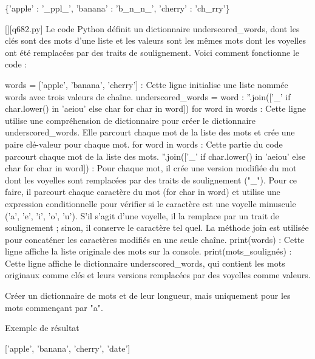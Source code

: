 \{'apple' : '\_ppl\_', 'banana' : 'b\_n\_n\_', 'cherry' : 'ch\_rry'\}
        \par
        \begin{solution}
            \renewcommand{\nomfichier}{q682.py}
            \pythonfile{\chemincode \nomfichier}[][\nomfichier]
            Le code Python définit un dictionnaire underscored_words, dont les clés sont des mots d'une liste et les valeurs sont les mêmes mots dont les voyelles ont été remplacées par des traits de soulignement. Voici comment fonctionne le code :

    words = ['apple', 'banana', 'cherry'] : Cette ligne initialise une liste nommée words avec trois valeurs de chaîne.
    underscored_words = {word : ''.join(['_' if char.lower() in 'aeiou' else char for char in word]) for word in words} : Cette ligne utilise une compréhension de dictionnaire pour créer le dictionnaire underscored_words. Elle parcourt chaque mot de la liste des mots et crée une paire clé-valeur pour chaque mot.
        for word in words : Cette partie du code parcourt chaque mot de la liste des mots.
        ''.join(['_' if char.lower() in 'aeiou' else char for char in word]) : Pour chaque mot, il crée une version modifiée du mot dont les voyelles sont remplacées par des traits de soulignement ("_"). Pour ce faire, il parcourt chaque caractère du mot (for char in word) et utilise une expression conditionnelle pour vérifier si le caractère est une voyelle minuscule ('a', 'e', 'i', 'o', 'u'). S'il s'agit d'une voyelle, il la remplace par un trait de soulignement ; sinon, il conserve le caractère tel quel. La méthode join est utilisée pour concaténer les caractères modifiés en une seule chaîne.
    print(words) : Cette ligne affiche la liste originale des mots sur la console.
    print(mots_soulignés) : Cette ligne affiche le dictionnaire underscored_words, qui contient les mots originaux comme clés et leurs versions remplacées par des voyelles comme valeurs.
        \end{solution}
        

        \question
        Créer un dictionnaire de mots et de leur longueur, mais uniquement pour les mots commençant par "a".

Exemple de résultat

['apple', 'banana', 'cherry', 'date']

